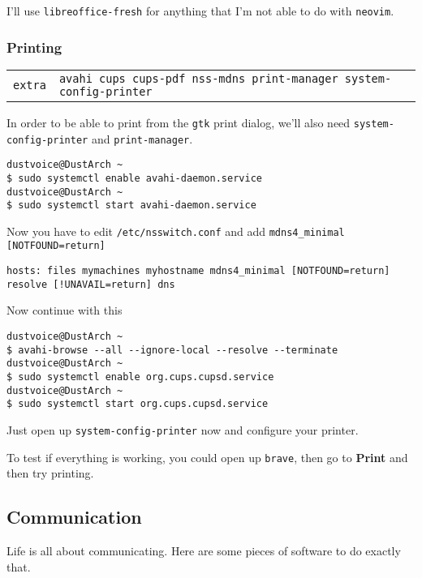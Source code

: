 \documentclass[9pt]{report}
\newenvironment{packagetable}
{\begin{longtabu}to \textwidth [b]{X[1,r]|X[1,l]}}
{\end{longtabu}}
\begin{document}
I’ll use \texttt{libreoffice-fresh} for anything that I’m not able to do with \texttt{neovim}.



\newpage

\hypertarget{x-printing}{\subsubsection{Printing}}
\begin{packagetable}
    \texttt{extra} & \texttt{avahi cups cups-pdf nss-mdns print-manager system-config-printer} \\ 
\end{packagetable}

In order to be able to print from the \texttt{gtk} print dialog, we’ll also need \texttt{system-config-printer} and \texttt{print-manager}.


\begin{verbatim}
dustvoice@DustArch ~
$ sudo systemctl enable avahi-daemon.service
dustvoice@DustArch ~
$ sudo systemctl start avahi-daemon.service
\end{verbatim}

Now you have to edit \texttt{/etc/nsswitch.conf} and add \texttt{mdns4\_minimal [NOTFOUND=return]}


\begin{verbatim}
hosts: files mymachines myhostname mdns4_minimal [NOTFOUND=return] resolve [!UNAVAIL=return] dns
\end{verbatim}

Now continue with this


\begin{verbatim}
dustvoice@DustArch ~
$ avahi-browse --all --ignore-local --resolve --terminate
dustvoice@DustArch ~
$ sudo systemctl enable org.cups.cupsd.service
dustvoice@DustArch ~
$ sudo systemctl start org.cups.cupsd.service
\end{verbatim}

Just open up \texttt{system-config-printer} now and configure your printer.


To test if everything is working, you could open up \texttt{brave}, then go to \textbf{Print} and then try printing.



\newpage

\hypertarget{x-communication}{\subsection{Communication}}
Life is all about communicating.
Here are some pieces of software to do exactly that.
\end{document}

